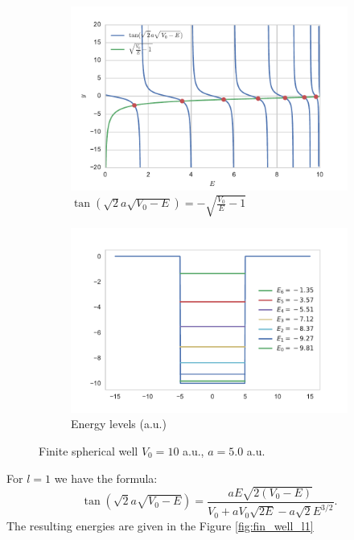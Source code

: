 \documentclass[a4paper, 12pt]{article}
\begin{document}
\begin{figure}[h!]
\centering
\begin{subfigure}{.5\textwidth}
  \centering
  \includegraphics[width=1.0\linewidth]{tan-sqrt.pdf}
  \caption{$\tan(\sqrt{2} a \sqrt{V_0-E})=-\sqrt{\frac{V_0}{E}-1}$}
  \label{fig1:tan-sqrt}
\end{subfigure}%
\begin{subfigure}{.5\textwidth}
  \centering
  \includegraphics[width=1.0\linewidth]{ens_finite.pdf}
  \caption{Energy levels (a.u.)}
  \label{fig:finite_well_sol}
\end{subfigure}
\caption{Finite spherical well $V_0 = 10$ a.u., $a=5.0$ a.u.}
\label{fig:fin_well}
\end{figure}
For $l=1$ we have the formula:
$$\tan(\sqrt{2} a \sqrt{V_0-E}) = \frac{a E \sqrt{2(V_0 - E)}}{V_0+a V_0 \sqrt{2E} -a \sqrt{2} E^{3/2}}.$$
The resulting energies are given in the Figure \ref{fig:fin_well_l1}
\end{document}

